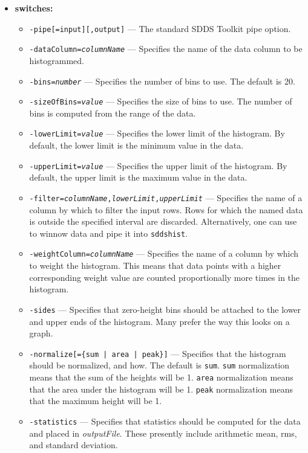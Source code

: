 \begin{itemize}
\item {\bf switches:}
    \begin{itemize}
    \item \verb|-pipe[=input][,output]| --- The standard SDDS Toolkit pipe option.
    \item {\tt -dataColumn={\em columnName}} --- Specifies the name of the data column to be histogrammed.
    \item {\tt -bins={\em number}} --- Specifies the number of bins to use.  The default is 20.
    \item {\tt -sizeOfBins={\em value}} --- Specifies the size of bins to use.  The number of bins is
        computed from the range of the data.
    \item {\tt -lowerLimit={\em value}} --- Specifies the lower limit of the histogram.  By default,
        the lower limit is the minimum value in the data.
    \item {\tt -upperLimit={\em value}} --- Specifies the upper limit of the histogram.  By default,
        the upper limit is the maximum value in the data.
    \item {\tt -filter={\em columnName},{\em lowerLimit},{\em upperLimit}} --- Specifies the name of a column by which to filter the input rows.
        Rows for which the named data is outside the specified interval are discarded.
        Alternatively, one can use 
        to winnow data and pipe it into {\tt sddshist}.
    \item {\tt -weightColumn={\em columnName}} --- Specifies the name of a column by which to weight the
        histogram.  This means that data points with a higher corresponding weight value
        are counted proportionally more times in the histogram.  
    \item {\tt -sides} --- Specifies that zero-height bins should be attached to the lower
        and upper ends of the histogram.  Many prefer the way this looks on a graph.
    \item {\tt -normalize[=\{sum | area | peak\}]} --- Specifies that the histogram should be normalized, and how.
        The default is {\tt sum}.  {\tt sum} normalization means that the sum of the heights will be 1.
        {\tt area} normalization means that the area under the histogram will be 1.
        {\tt peak} normalization means that the maximum height will be 1.
    \item {\tt -statistics} --- Specifies that statistics should be computed for the data and
        placed in {\em outputFile}.  These presently include arithmetic mean, rms, and standard deviation.

\end{itemize}
\end{itemize}
